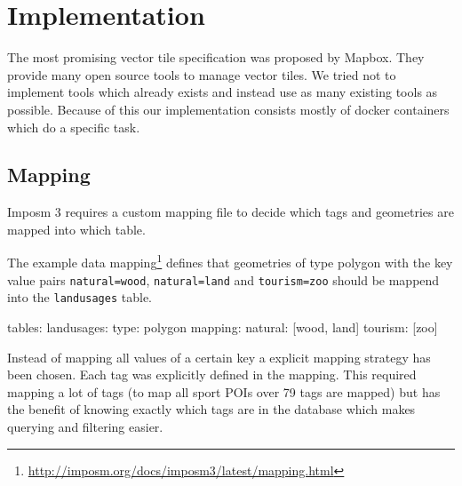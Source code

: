 \chapter{Implementation}\label{implementation}

The most promising vector tile specification was proposed by Mapbox.
They provide many open source tools to manage vector tiles. We tried not to implement tools which already exists and instead use as many existing tools as possible. Because of this our implementation consists mostly of docker containers which do a specific task.

\section{Mapping}

Imposm 3 requires a custom mapping file to decide which tags and geometries are mapped into which table.

The example data mapping\footnote{\url{http://imposm.org/docs/imposm3/latest/mapping.html}} defines that geometries of type polygon with the key value pairs \texttt{natural=wood}, \texttt{natural=land} and \texttt{tourism=zoo} should be mappend into the \texttt{landusages} table.

\begin{yamlcode}
tables:
   landusages:
     type: polygon
     mapping:
       natural: [wood, land]
       tourism: [zoo]
\end{yamlcode}

Instead of mapping all values of a certain key a explicit mapping strategy has been chosen. Each tag was explicitly defined in the mapping. This required mapping a lot of tags (to map all sport POIs over 79 tags are mapped) but has the benefit of knowing exactly which tags are in the database which makes querying and filtering easier.


